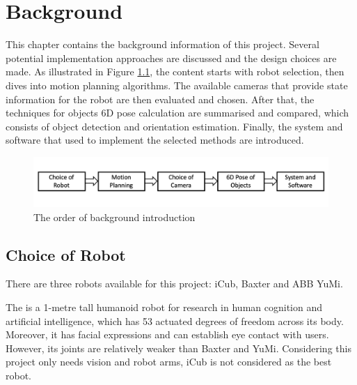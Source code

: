 \chapter{Background}

This chapter contains the background information of this project. Several potential implementation approaches are discussed and the design choices are made. As illustrated in Figure \ref{bgov}, the content starts with robot selection, then dives into motion planning algorithms. The available cameras that provide state information for the robot are then evaluated and chosen. After that, the techniques for objects 6D pose calculation are summarised and compared, which consists of object detection and orientation estimation. Finally, the system and software that used to implement the selected methods are introduced.

\begin{figure}[H]
\centering
\includegraphics[width = \columnwidth]{background/backgroundov.png}
\caption{The order of background introduction}
\label{bgov}
\end{figure}

\section{Choice of Robot}
There are three robots available for this project: iCub, Baxter and ABB YuMi.

The \citep{iCub} is a 1-metre tall humanoid robot for research in human cognition and artificial intelligence, which has 53 actuated degrees of freedom across its body. Moreover, it has facial expressions and can establish eye contact with users. However, its joints are relatively weaker than Baxter and YuMi. Considering this project only needs vision and robot arms, iCub is not considered as the best robot.

